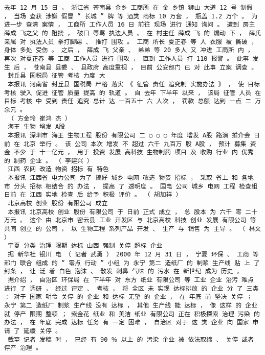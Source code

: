 \documentclass{article}
\begin{document}
\begin{Verbatim}[commandchars=\\\{\}]
 去年 12 月 15 日 ， 浙江省 苍南县 金乡 工商所 在 金 乡镇 狮山 大道 12 号 制假 ， 当场 查获 涉嫌 假冒 “ 长城 ” 牌 等 酒类 商标 10 万套 ， 瓶盖 1.2 万个 。 为 进一步 查清 案情 ， 工商所 工作人员 16 日 前往 现场 进行 通知 询问 。 遭到 房主 薛成 飞之父 的 阻挠 ， 破口 辱骂 执法人员 。 在 村主任 薛成 飞 的 煽动 下 ， 薛氏 亲属 对 执法人员 拳打脚踢 、 推打 围攻 。 工商 所长 夏正春 等 人 衣服 被 撕破 ， 身体 多处 受伤 。 之后 ， 薛成 飞 父亲 、 弟弟 等 20 多人 又 冲进 工商所 内 ， 再次 对夏正春 等 工商 工作人员 进行 围攻 ， 直到 工作人员 打 110 报警 。 此事 发生 后 ， 苍南县 县委 、 县政府 高度重视 ， 目前 公安部门 已 对 此事 立案 调查 。 
 封丘县 国税局 征管 考核 力度 大 
 本报讯 河南省 封丘县 国税局 严格 落实 《 征管 责任 追究制 实施办法 》 ， 使 目标 考核 驶入 促进 征管 质量 提高 的 轨道 。 自 去年 下半年 以来 ， 该局 征管 人员 在 目标 考核 中 受到 责任 追究 总计 达 一百五十 六 人次 ， 罚款 总额 达到 一点 二 万余元 。 
 （ 方金玲 崔鸿 杰 ） 
 海王 生物 增发 A股 
 本报讯 深圳市 海王 生物工程 股份 有限公司 二 ○ ○ ○ 年度 增发 A股 路演 推介会 日前 在 北京 举行 。 该 公司 本次 增发 不 超过 六千 九百万 股 A股 ， 预计 募集 资金 不少 于 十一亿元 ， 用于 投资 发展 高科技 生物制药 项目 及 收购 行业 内 优秀 的 制药 企业 。 （ 李建兴 ） 
 江西 农网 改造 物资 招标 有 特色 
 本报讯 江西省 电力公司 为了 搞好 城乡 电网 改造 物资 招标 ， 采取 省上 和 各地 市 分头 招标 相结合 的 办法 ， 提高 了 透明度 。 国电 公司 城乡 电网 工程 检查组 日前 在 江西 实地 检查 后 给予 积极 评价 。 （ 胡加祥 ） 
 北京高校 创业 股份 有限公司 成立 
 本报讯 北京高校 创业 股份 有限公司 于 日前 正式 成立 ， 总 股本 为 六千 零 二十万元 。 这个 由 北京市 密云县 工业 开发区 与 北京高校 科技 创业 发展 有限公司 等 共同 创立 的 公司 ， 以 生物工程 系列产品 开发 、 生产 与 销售 为 主导 。 （ 林文 ） 
 宁夏 分类 治理 限期 达标 山西 强制 关停 超标 企业 
 据 新华社 银川 电 （ 记者 武勇 ） 2000 年 12 月 31 日 ， 宁夏 环保 、 工商 等 部门 联合 组成 的 “ 零点 行动 ” 小组 为 永宁 第二 造纸厂 的 制浆 生产线 贴 上 了 封条 ， 让 泛 着 白色 泡沫 、 散发 刺鼻 气味 的 污水 在 新世纪 成为 历史 。 
 据介绍 ， 自治区 环保局 在 下半年 对 东方 纸业 有限公司 等 工业 企业 治污 难点 进行 了 调研 ， 经过 评定 、 考核 ， 将 全区 未 实现 达标排放 的 企业 分 了 三类 ： 对于 国家 明令 关停 的 企业 和 达标 无望 的 企业 ， 在 年底 前 坚决 关停 ； 永宁 第二 造纸厂 制浆 生产线 没有 达标 ， 其他 生产线 能 达标 ， 像 这样 的 企业 就 停产 限期 整顿 ； 紫金花 纸业 和 美洁 纸业 有限公司 正在 积极探索 治理 污染 的 办法 ， 在 年底 完成 达标 任务 有 一定 困难 ， 自治区 对于 这 类 企业 向 国家 申请 了 延缓 关停 。 
 截至 记者 发稿 时 ， 已经 有 90 ％ 以上 的 污染 企业 被 依法取缔 、 关停 或者 停产 治理 。 

\end{Verbatim}
\end{document}
